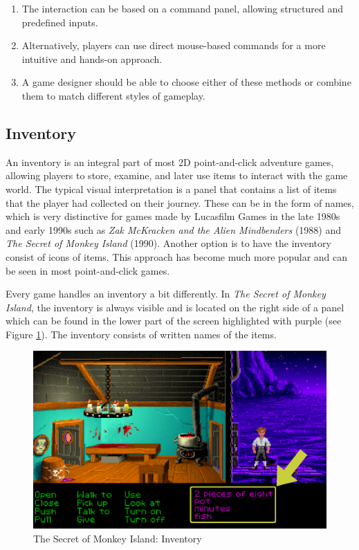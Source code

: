 \begin{enumerate}[label=\color{teal}\textbf{R{\arabic*}}]
  \item \label{intro:req:com_pan} The interaction can be based on a command panel, allowing structured and predefined inputs.
  \item \label{intro:req:mouse} Alternatively, players can use direct mouse-based commands for a more intuitive and hands-on approach.
  \item \label{intro:req:mix} A game designer should be able to choose either of these methods or combine them to match different styles of gameplay.
  \end{enumerate}

\subsection{Inventory}
\label{sec:Inventory}
An inventory is an integral part of most 2D point-and-click adventure games, allowing players to store, examine, and later use items to interact with the game world. The typical visual interpretation is a panel that contains a list of items that the player had collected on their journey. These can be in the form of names, which is very distinctive for games made by Lucasfilm Games in the late 1980s and early 1990s such as \textit{Zak McKracken and the Alien Mindbenders} (1988) and \textit{The Secret of Monkey Island} (1990). Another option is to have the inventory consist of icons of items. This approach has become much more popular and can be seen in most point-and-click games.

Every game handles an inventory a bit differently. In \textit{The Secret of Monkey Island}, the inventory is always visible and is located on the right side of a panel which can be found in the lower part of the screen highlighted with purple (see Figure \ref{fig:I-TSoMI}). The inventory consists of written names of the items. 

\begin{figure}[H]
\centering
\includegraphics[width=.8\linewidth]{img/I-TSoMI.png}
\caption{The Secret of Monkey Island: Inventory}
\label{fig:I-TSoMI}
\end{figure}

